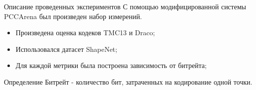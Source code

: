 \documentclass[aspectratio=169]{beamer}
\begin{document}
  \begin{frame}{Описание проведенных экспериментов}
    С помощью модифицированной системы PCCArena был произведен набор измерений.

    \begin{itemize}
      \item Произведена оценка кодеков TMC13 и Draco;
      \item Использовался датасет ShapeNet;
      \item Для каждой метрики была построена зависимость от битрейта;
    \end{itemize}

    \begin{block}{Определение}
      Битрейт - количество бит, затраченных на кодирование одной точки.
    \end{block}
  \end{frame}
\end{document}
